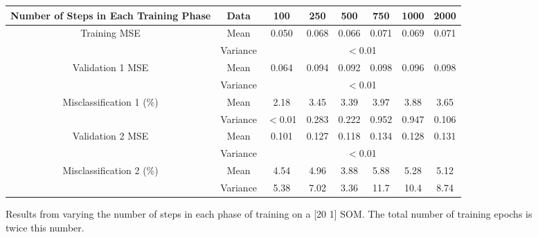 \documentclass[10pt, oneside]{article}
\begin{document}
\begin{figure}[h]
\begin{center}
\fontsize{9}{11}\selectfont
\begin{tabular}{|*{8}{c|}}
\hline 
Number of Steps in Each Training Phase & Data & 100 & 250 & 500 & 750 & 1000 & 2000 \\ \hline
\multirow{2}{*}{Training MSE} & Mean & 0.050 & 0.068 & 0.066 & 0.071 & 0.069 & 0.071 \\ \cline{2-8}
\ & Variance & \multicolumn{6}{c|}{$<$0.01} \\ \hline
\multirow{2}{*}{Validation 1 MSE} & Mean & 0.064 & 0.094 & 0.092 & 0.098 & 0.096 & 0.098  \\ \cline{2-8}
\ & Variance & \multicolumn{6}{c|}{$<$0.01} \\ \hline
\multirow{2}{*}{Misclassification 1 (\%)} & Mean & 2.18 & 3.45 & 3.39 & 3.97 & 3.88 & 3.65 \\ \cline{2-8}
\ & Variance & $<$0.01 & 0.283 & 0.222 & 0.952 & 0.947 & 0.106 \\ \hline
\multirow{2}{*}{Validation 2 MSE} & Mean & 0.101 & 0.127 & 0.118 & 0.134 & 0.128 & 0.131 \\ \cline{2-8}
\ & Variance & \multicolumn{6}{c|}{$<$0.01} \\ \hline
\multirow{2}{*}{Misclassification 2 (\%)} & Mean & 4.54 & 4.96 & 3.88 & 5.88 & 5.28 & 5.12 \\ \cline{2-8}
\ & Variance & 5.38 & 7.02 & 3.36 & 11.7 & 10.4 & 8.74 \\ \hline
\end{tabular}
\end{center}
\caption{\label{fig:steps-testing} Results from varying the number of steps in each phase of training on a [20 1] SOM. The total number of training epochs is twice this number.}
\end{figure}
\end{document}
